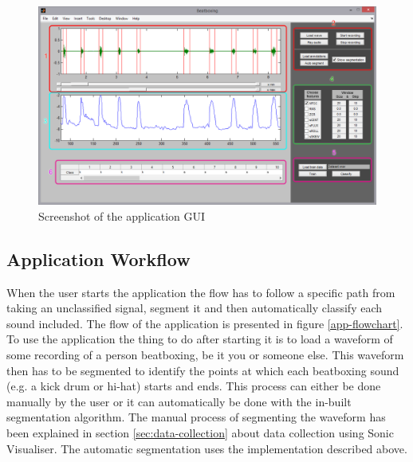 \begin{figure}
\begin{center}
\includegraphics[width=\textwidth]{fig/Application.png}
\caption{Screenshot of the application GUI}
\label{app-gui}
\end{center}
\end{figure}

\subsection{Application Workflow}
When the user starts the application the flow has to follow a specific path from taking an unclassified signal, segment it and then automatically classify each sound included. The flow of the application is presented in figure \ref{app-flowchart}. To use the application the thing to do after starting it is to load a waveform of some recording of a person beatboxing, be it you or someone else. This waveform then has to be segmented to identify the points at which each beatboxing sound (e.g. a kick drum or hi-hat) starts and ends. This process can either be done manually by the user or it can automatically be done with the in-built segmentation algorithm. The manual process of segmenting the waveform has been explained in section \ref{sec:data-collection} about data collection using Sonic Visualiser. The automatic segmentation uses the implementation described above.

